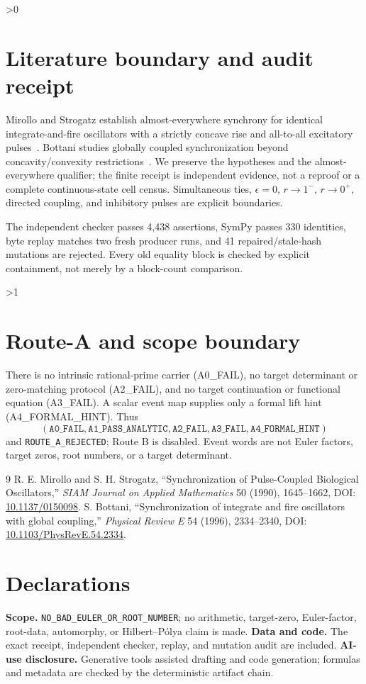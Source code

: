 \documentclass[10pt]{article}
\begin{document}
\ifnum\CRevisionRound>0
\section{Literature boundary and audit receipt}
Mirollo and Strogatz establish almost-everywhere synchrony for identical
integrate-and-fire oscillators with a strictly concave rise and all-to-all
excitatory pulses~\cite{mirollo1990}.  Bottani studies globally coupled
synchronization beyond concavity/convexity restrictions~\cite{bottani1996}.  We preserve the hypotheses and the
almost-everywhere qualifier; the finite receipt is independent evidence, not
a reproof or a complete continuous-state cell census.  Simultaneous ties,
\(\epsilon=0\), \(r\to1^-\), \(r\to0^+\), directed coupling, and inhibitory
pulses are explicit boundaries.

The independent checker passes 4,438 assertions, SymPy passes 330 identities,
byte replay matches two fresh producer runs, and 41 repaired/stale-hash
mutations are rejected.  Every old equality block is checked by explicit
containment, not merely by a block-count comparison.
\fi

\ifnum\CRevisionRound>1
\section{Route-A and scope boundary}
There is no intrinsic rational-prime carrier (A0\_FAIL), no target determinant
or zero-matching protocol (A2\_FAIL), and no target continuation or functional
equation (A3\_FAIL).  A scalar event map supplies only a formal lift hint
(A4\_FORMAL\_HINT).  Thus
\[
(\mathtt{A0\_FAIL},\mathtt{A1\_PASS\_ANALYTIC},\mathtt{A2\_FAIL},
 \mathtt{A3\_FAIL},\mathtt{A4\_FORMAL\_HINT})
\]
and \texttt{ROUTE\_A\_REJECTED}; Route B is disabled.  Event words are not
Euler factors, target zeros, root numbers, or a target determinant.
\fi

\begin{thebibliography}{9}
 R. E. Mirollo and S. H. Strogatz, ``Synchronization of
Pulse-Coupled Biological Oscillators,'' \emph{SIAM Journal on Applied
Mathematics} 50 (1990), 1645--1662, DOI:
\href{https://doi.org/10.1137/0150098}{10.1137/0150098}.
 S. Bottani, ``Synchronization of integrate and fire
oscillators with global coupling,'' \emph{Physical Review E} 54 (1996), 2334--2340,
DOI: \href{https://doi.org/10.1103/PhysRevE.54.2334}{10.1103/PhysRevE.54.2334}.
\end{thebibliography}

\section*{Declarations}
\textbf{Scope.} \texttt{NO\_BAD\_EULER\_OR\_ROOT\_NUMBER}; no arithmetic,
target-zero, Euler-factor, root-data, automorphy, or Hilbert--Pólya claim is
made.  \textbf{Data and code.} The exact receipt, independent checker, replay,
and mutation audit are included.  \textbf{AI-use disclosure.} Generative
tools assisted drafting and code generation; formulas and metadata are
checked by the deterministic artifact chain.
\end{document}
